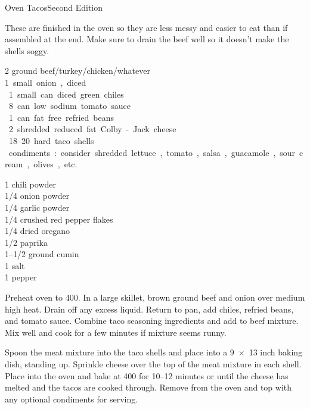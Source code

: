 \begin{entry}{Oven Tacos}{Second Edition}

\begin{open}
These are finished in the oven so they are less messy and easier to eat than if assembled at the end. Make sure to drain the beef well so it doesn't make the shells soggy.
\end{open}
\begin{ingredients}
  \SI{2}{\pound} ground beef/turkey/chicken/whatever\\
  \SI{1} small onion, diced\\
  \SI{1} small can diced green chiles\\
  \SI{8}{\ounce} can low sodium tomato sauce \\
  \SI{1}{\pound} can fat free refried beans \\
  \SI{2}{\cup} shredded reduced fat Colby-Jack cheese\\
  \numrange{18}{20} hard taco shells\\
  condiments: consider shredded lettuce, tomato, salsa, guacamole, sour cream, olives, etc.
\end{ingredients}
\begin{ingredients}
  \SI{1}{\tblspoon} chili powder\\
  \SI{1/4}{\teaspoon} onion powder\\
  \SI{1/4}{\teaspoon} garlic powder\\
  \SI{1/4}{\teaspoon} crushed red pepper flakes\\
  \SI{1/4}{\teaspoon} dried oregano\\
  \SI{1/2}{\teaspoon} paprika\\
  \SIrange{1}{1/2}{\teaspoon} ground cumin\\
  \SI{1}{\teaspoon} salt\\
\SI{1}{\teaspoon} pepper
\end{ingredients}
Preheat oven to \SI{400}{\degreeF}. In a large skillet, brown ground beef and onion over medium high heat. Drain off any excess liquid. Return to pan, add chiles, refried beans, and tomato sauce. Combine taco seasoning ingredients and add to beef mixture. Mix well and cook for a few minutes if mixture seems runny.

Spoon the meat mixture into the taco shells and place into a \num{9x13} inch baking dish, standing up. Sprinkle cheese over the top of the meat mixture in each shell. Place into the oven and bake at \SI{400}{\degreeF} for \numrange{10}{12} minutes or until the cheese has melted and the tacos are cooked through. Remove from the oven and top with any optional condiments for serving.

\end{entry}

